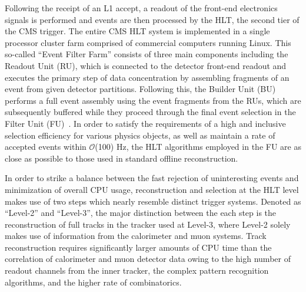 Following the receipt of an L1 accept, a readout of the front-end electronics signals is performed and events are then processed by the HLT, the second tier of the CMS trigger. The entire CMS HLT system is implemented in a single processor cluster farm comprised of commercial computers running Linux. This so-called ``Event Filter Farm'' consists of three main components including the Readout Unit (RU), which is connected to the detector front-end readout and executes the primary step of data concentration by assembling fragments of an event from given detector partitions. Following this, the Builder Unit (BU) performs a full event assembly using the event fragments from the RUs, which are subsequently buffered while they proceed through the final event selection in the Filter Unit (FU)~\cite{Andre}. In order to satisfy the requirements of a high and inclusive selection efficiency for various physics objects, as well as maintain a rate of accepted events within $\mathcal{O}$(100) Hz, the HLT algorithms employed in the FU are as close as possible to those used in standard offline reconstruction. 

In order to strike a balance between the fast rejection of uninteresting events and minimization of overall CPU usage, reconstruction and selection at the HLT level makes use of two steps which nearly resemble distinct trigger systems. Denoted as ``Level-2'' and ``Level-3'', the major distinction between the each step is the reconstruction of full tracks in the tracker used at Level-3, where Level-2 solely makes use of information from the calorimeter and muon systems. Track reconstruction requires significantly larger amounts of CPU time than the correlation of calorimeter and muon detector data owing to the high number of readout channels from the inner tracker, the complex pattern recognition algorithms, and the higher rate of combinatorics. 

